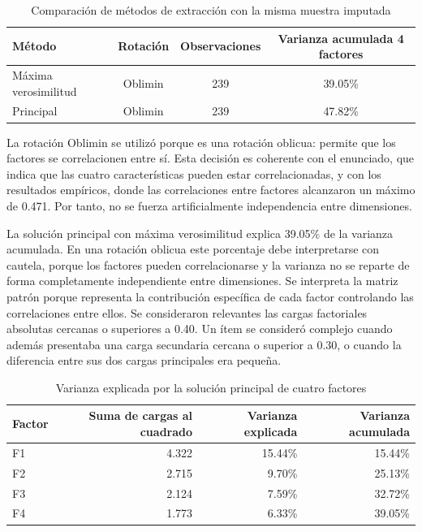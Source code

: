\documentclass[12pt,letterpaper]{article}
\begin{document}
\begin{table}[H]
\centering
\caption{Comparación de métodos de extracción con la misma muestra imputada}
\begin{tabular}{lccc}
\toprule
Método & Rotación & Observaciones & Varianza acumulada 4 factores \\
\midrule
Máxima verosimilitud & Oblimin & 239 & 39.05\% \\
Principal & Oblimin & 239 & 47.82\% \\
\bottomrule
\end{tabular}
\end{table}

La rotación Oblimin se utilizó porque es una rotación oblicua: permite que los factores se correlacionen entre sí. Esta decisión es coherente con el enunciado, que indica que las cuatro características pueden estar correlacionadas, y con los resultados empíricos, donde las correlaciones entre factores alcanzaron un máximo de 0.471. Por tanto, no se fuerza artificialmente independencia entre dimensiones.

La solución principal con máxima verosimilitud explica 39.05\% de la varianza acumulada. En una rotación oblicua este porcentaje debe interpretarse con cautela, porque los factores pueden correlacionarse y la varianza no se reparte de forma completamente independiente entre dimensiones. Se interpreta la matriz patrón porque representa la contribución específica de cada factor controlando las correlaciones entre ellos. Se consideraron relevantes las cargas factoriales absolutas cercanas o superiores a 0.40. Un ítem se consideró complejo cuando además presentaba una carga secundaria cercana o superior a 0.30, o cuando la diferencia entre sus dos cargas principales era pequeña.

\begin{table}[H]
\centering
\caption{Varianza explicada por la solución principal de cuatro factores}
\label{tab:p2-varianza}
\begin{tabular}{lrrr}
\toprule
Factor & Suma de cargas al cuadrado & Varianza explicada & Varianza acumulada \\
\midrule
F1 & 4.322 & 15.44\% & 15.44\% \\
F2 & 2.715 & 9.70\% & 25.13\% \\
F3 & 2.124 & 7.59\% & 32.72\% \\
F4 & 1.773 & 6.33\% & 39.05\% \\
\bottomrule
\end{tabular}
\end{table}
\end{document}
